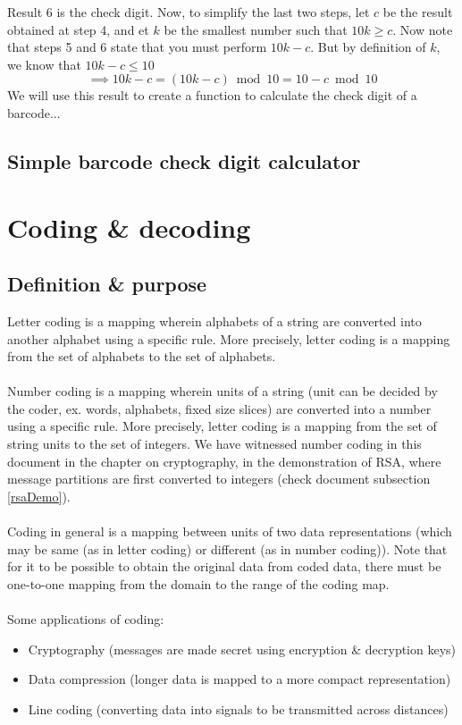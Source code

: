 Result 6 is the check digit. Now, to simplify the last two steps, let $c$ be the result obtained at step 4, and et $k$ be the smallest number such that $10k \geq c$. Now note that steps 5 and 6 state that you must perform $10k - c$. But by definition of $k$, we know that $10k - c \leq 10$
\[\implies 10k - c = (10k-c) \bmod 10 = 10 - c \bmod 10\]
We will use this result to create a function to calculate the check digit of a barcode...

\section{Simple barcode check digit calculator}


\chapter{Coding \& decoding}
\section{Definition \& purpose}
Letter coding is a mapping wherein alphabets of a string are converted into another alphabet using a specific rule. More precisely, letter coding is a mapping from the set of alphabets to the set of alphabets.
\\~\\
Number coding is a mapping wherein units of a string (unit can be decided by the coder, ex. words, alphabets, fixed size slices) are converted into a number using a specific rule. More precisely, letter coding is a mapping from the set of string units to the set of integers. We have witnessed number coding in this document in the chapter on cryptography, in the demonstration of RSA, where message partitions are first converted to integers (check document subsection \ref{rsaDemo}).
\\~\\
Coding in general is a mapping between units of two data representations (which may be same (as in letter coding) or different (as in number coding)). Note that for it to be possible to obtain the original data from coded data, there must be one-to-one mapping from the domain to the range of the coding map.
\\~\\
Some applications of coding:
\begin{itemize}
	\item Cryptography (messages are made secret using encryption \& decryption keys)
	\item Data compression (longer data is mapped to a more compact representation)
	\item Line coding (converting data into signals to be transmitted across distances)
\end{itemize}

